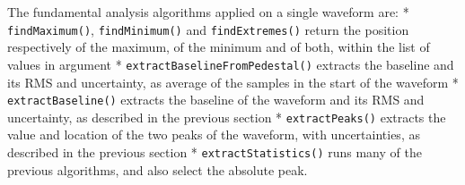 The fundamental analysis algorithms applied on a single waveform are: *
\texttt{findMaximum()}, \texttt{findMinimum()} and
\texttt{findExtremes()} return the position respectively of the maximum,
of the minimum and of both, within the list of values in argument *
\texttt{extractBaselineFromPedestal()} extracts the baseline and its RMS
and uncertainty, as average of the samples in the start of the waveform
* \texttt{extractBaseline()} extracts the baseline of the waveform and
its RMS and uncertainty, as described in the previous section *
\texttt{extractPeaks()} extracts the value and location of the two peaks
of the waveform, with uncertainties, as described in the previous
section * \texttt{extractStatistics()} runs many of the previous
algorithms, and also select the absolute peak.
